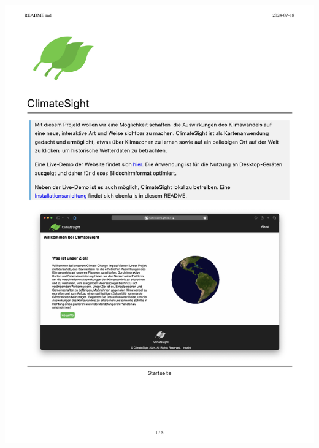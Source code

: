 \documentclass[12pt]{article}
\begin{document}
\includegraphics[width=\textwidth, page=5]{Planungsdokumente/graphics/README.pdf}
\end{document}
